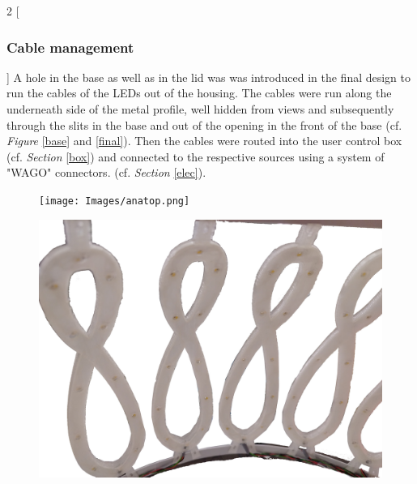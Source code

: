 \documentclass[a4paper,9pt]{article}
\begin{document}
    \begin{multicols}{2}
    [
    \subsubsection{Cable management}
    ]
    A hole in the base as well as in the lid was was introduced in the final design to run the cables of the LEDs out of the housing. The cables were run along the underneath side of the metal profile, well hidden from views and subsequently through the slits in the base and out of the opening in the front of the base (cf. \textit{Figure} \ref{base} and \ref{final}). Then the cables were routed into the user control box (cf. \textit{Section} \ref{box}) and connected to the respective sources using a system of "WAGO" connectors. (cf. \textit{Section} \ref{elec}).
    \end{multicols}
     \begin{minipage}{0.48\linewidth}
     \begin{figure}[H]
        \centering
        \texttt{[image: Images/anatop.png]}
         \label{partshousing}
         \end{figure}
    \end{minipage}
    \hfill
    \begin{minipage}{0.48\linewidth}
    \begin{figure}[H]
         \centering
        \includegraphics[width=.54\linewidth]{Images/ana bottom.png}
        \label{cut}
        \end{figure}
    \end{minipage}
    
\end{document}
